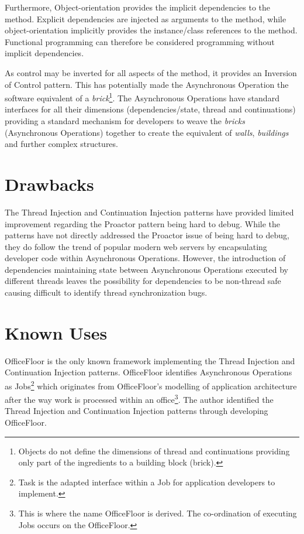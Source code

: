 \documentclass[prodmode]{style/acmlarge}
\begin{document}
Furthermore, Object-orientation provides the implicit dependencies to the
method.  Explicit dependencies are injected as arguments to the method, while
object-orientation implicitly provides the instance/class references to the
method.  Functional programming can therefore be considered programming without
implicit dependencies.

As control may be inverted for all aspects of the method, it provides an
Inversion of Control pattern.  This has potentially made the Asynchronous
Operation the software equivalent of a \textit{brick}\footnote{Objects do not
define the dimensions of thread and continuations providing only part of the
ingredients to a building block (brick).}.  The Asynchronous Operations have
standard interfaces for all their dimensions (dependencies/state, thread and
continuations) providing a standard mechanism for developers to weave the
\textit{bricks} (Asynchronous Operations) together to create the equivalent of
\textit{walls}, \textit{buildings} and further complex structures.


\section{Drawbacks}

The Thread Injection and Continuation Injection patterns have provided limited
improvement regarding the Proactor pattern being hard to debug.  While the
patterns have not directly addressed the Proactor issue of being hard to debug,
they do follow the trend of popular modern web servers by encapsulating
developer code within Asynchronous Operations.  However, the introduction of
dependencies maintaining state between Asynchronous Operations executed by
different threads leaves the possibility for dependencies to be non-thread safe
causing difficult to identify thread synchronization bugs.


\section{Known Uses}

OfficeFloor \cite{officefloor} is the only known framework implementing the
Thread Injection and Continuation Injection patterns.  OfficeFloor identifies
Asynchronous Operations as Jobs\footnote{Task is the adapted interface within a
Job for application developers to implement.} which originates from
OfficeFloor's modelling of application architecture after the way work is
processed within an office\footnote{This is where the name OfficeFloor is
derived. The co-ordination of executing Jobs occurs on the OfficeFloor.}. 
The author identified the Thread Injection and Continuation Injection patterns
through developing OfficeFloor.
\end{document}
